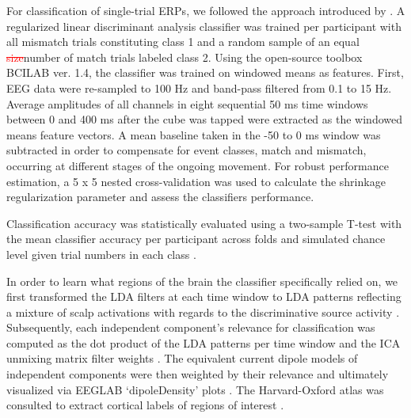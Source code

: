 For classification \textcolor{n}{of single-trial ERPs}, we followed the approach introduced by \cite{Zander2016-ed}. A regularized linear discriminant analysis classifier was trained per participant with all mismatch trials constituting class 1 and a random sample of an equal \textcolor{red}{\st{size}}\textcolor{n}{number} of match trials labeled class 2. Using the open-source toolbox BCILAB ver. 1.4, the classifier was trained on windowed means as features. First, EEG data were re-sampled to 100 Hz and band-pass filtered from 0.1 to 15 Hz. Average amplitudes of all channels in eight sequential 50 ms time windows between 0 and 400 ms after the cube was tapped were extracted as the windowed means feature vectors. A mean baseline taken in the -50 to 0 ms window was subtracted in order to compensate for event classes, match and mismatch, occurring at different stages of the ongoing movement. For robust performance estimation, a 5 x 5 nested cross-validation was used to calculate the shrinkage regularization parameter and assess the classifiers performance.

Classification accuracy was statistically evaluated using a two-sample T-test with the mean classifier accuracy per participant across folds and simulated chance level given trial numbers in each class \cite{Muller-Putz2007-oc}.

In order to learn what regions of the brain the classifier specifically relied on, we first transformed the LDA filters at each time window to LDA patterns reflecting a mixture of scalp activations with regards to the discriminative source activity \cite{Haufe2014-do}. \textcolor{n}{Subsequently, each independent component's relevance for classification was computed as the dot product of the LDA patterns per time window and the ICA unmixing matrix filter weights} \cite{Zander2016-ed}. The equivalent current dipole models of independent components were then weighted by their relevance and ultimately visualized via EEGLAB `dipoleDensity' plots \cite{Krol2018-cw}. The Harvard-Oxford atlas was consulted to extract cortical labels of regions of interest \cite{Makris2006-kp}.





